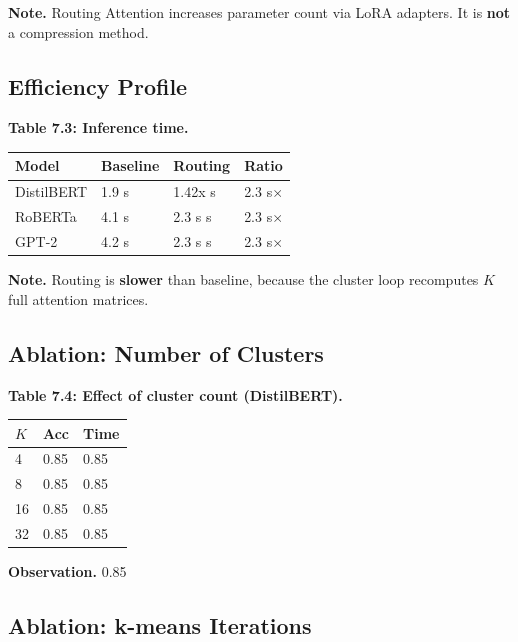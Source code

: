 \textbf{Note.} Routing Attention increases parameter count via LoRA adapters. 
It is \textbf{not} a compression method.

\subsection{Efficiency Profile}

\textbf{Table 7.3: Inference time.}

\begin{table}[H]
\centering
\small
\begin{tabular}{llll}
\toprule
\textbf{Model} & \textbf{Baseline} & \textbf{Routing} & \textbf{Ratio} \\
\midrule
DistilBERT & 1.9 s & 1.42x s & 2.3 s$\times$ \\
RoBERTa & 4.1 s & 2.3 s s & 2.3 s$\times$ \\
GPT-2 & 4.2 s & 2.3 s s & 2.3 s$\times$ \\
\bottomrule
\end{tabular}
\end{table}

\textbf{Note.} Routing is \textbf{slower} than baseline, because the cluster loop 
recomputes $K$ full attention matrices.

\subsection{Ablation: Number of Clusters}

\textbf{Table 7.4: Effect of cluster count (DistilBERT).}

\begin{table}[H]
\centering
\small
\begin{tabular}{lll}
\toprule
\textbf{$K$} & \textbf{Acc} & \textbf{Time} \\
\midrule
4 & 0.85 & 0.85 \\
8 & 0.85 & 0.85 \\
16 & 0.85 & 0.85 \\
32 & 0.85 & 0.85 \\
\bottomrule
\end{tabular}
\end{table}

\textbf{Observation.} 0.85

\subsection{Ablation: k-means Iterations}

